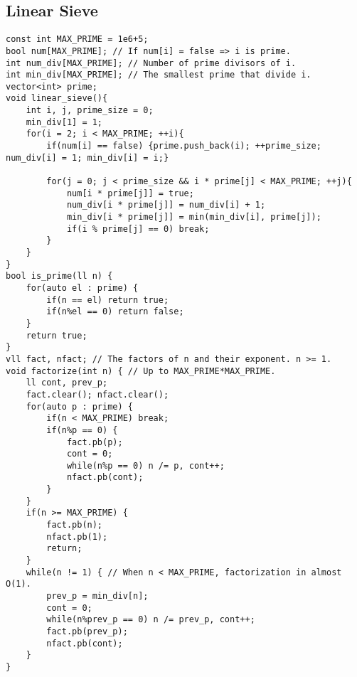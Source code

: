 \documentclass[a4paper]{article}
\begin{document}
\subsection*{Linear Sieve}
\begin{verbatim}
const int MAX_PRIME = 1e6+5;
bool num[MAX_PRIME]; // If num[i] = false => i is prime.
int num_div[MAX_PRIME]; // Number of prime divisors of i.
int min_div[MAX_PRIME]; // The smallest prime that divide i.
vector<int> prime;
void linear_sieve(){
    int i, j, prime_size = 0;
    min_div[1] = 1;
    for(i = 2; i < MAX_PRIME; ++i){
        if(num[i] == false) {prime.push_back(i); ++prime_size; num_div[i] = 1; min_div[i] = i;}
        
        for(j = 0; j < prime_size && i * prime[j] < MAX_PRIME; ++j){
            num[i * prime[j]] = true;
            num_div[i * prime[j]] = num_div[i] + 1;
            min_div[i * prime[j]] = min(min_div[i], prime[j]);
            if(i % prime[j] == 0) break;
        }
    }
}
bool is_prime(ll n) {
    for(auto el : prime) {
        if(n == el) return true;
        if(n%el == 0) return false;
    }
    return true;
}
vll fact, nfact; // The factors of n and their exponent. n >= 1.
void factorize(int n) { // Up to MAX_PRIME*MAX_PRIME.
    ll cont, prev_p;
    fact.clear(); nfact.clear();
    for(auto p : prime) {
        if(n < MAX_PRIME) break;
        if(n%p == 0) {
            fact.pb(p);
            cont = 0;
            while(n%p == 0) n /= p, cont++;
            nfact.pb(cont);
        }
    } 
    if(n >= MAX_PRIME) {
        fact.pb(n);
        nfact.pb(1);
        return;
    }
    while(n != 1) { // When n < MAX_PRIME, factorization in almost O(1).
        prev_p = min_div[n];
        cont = 0;
        while(n%prev_p == 0) n /= prev_p, cont++;
        fact.pb(prev_p);
        nfact.pb(cont);
    }
}
\end{verbatim}
\end{document}
